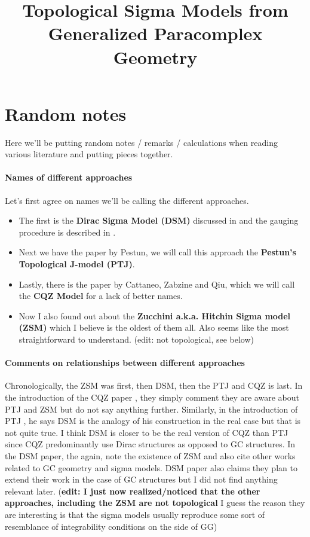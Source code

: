 \documentclass{article}
\title{Topological Sigma Models from Generalized Paracomplex Geometry}
\date{}
\theoremstyle{definition}
\theoremstyle{definition}
\theoremstyle{remark}
\theoremstyle{ref}
\begin{document}
\maketitle
\begin{abstract}

\end{abstract}
\newpage
\section*{Random notes}
Here we'll be putting random notes / remarks / calculations when reading various literature and putting pieces together.

\paragraph*{Names of different approaches}
Let's first agree on names we'll be calling the different approaches. 
\begin{itemize}
\item The first is the {\bf Dirac Sigma Model (DSM)} discussed in \cite{DSM1,DSM2} and the gauging procedure is described in \cite{DSMgauge1,DSMgauge2}.
\item Next we have the paper \cite{Pestun:2006rj} by Pestun, we will call this approach the {\bf Pestun's Topological J-model (PTJ)}.
\item Lastly, there is the paper \cite{Cattaneo:2009zx} by Cattaneo, Zabzine and Qiu, which we will call the {\bf CQZ Model} for a lack of better names.
\item Now I also found out about the {\bf Zucchini a.k.a. Hitchin Sigma model (ZSM)} \cite{Zucchini:2004ta} which I believe is the oldest of them all. Also seems like the most straightforward to understand. (edit: not topological, see below)
\end{itemize}

\paragraph*{Comments on relationships between different approaches}
Chronologically, the ZSM was first, then DSM, then the PTJ and CQZ is last. In the introduction of the CQZ paper \cite{Cattaneo:2009zx}, they simply comment they are aware about PTJ and ZSM but do not say anything further. Similarly, in the introduction of PTJ \cite{Pestun:2006rj}, he says DSM is the analogy of his construction in the real case but that is not quite true. I think DSM is closer to be the real version of CQZ than PTJ since CQZ predominantly use Dirac structures as opposed to GC structures. In the DSM paper, the again, note the existence of ZSM and also cite other works related to GC geometry and sigma models. DSM paper also claims they plan to extend their work in the case of GC structures but I did not find anything relevant later. ({\bf edit: I just now realized/noticed that the other approaches, including the ZSM are not topological} I guess the reason they are interesting is that the sigma models usually reproduce some sort of resemblance of integrability conditions on the side of GG)
\end{document}
